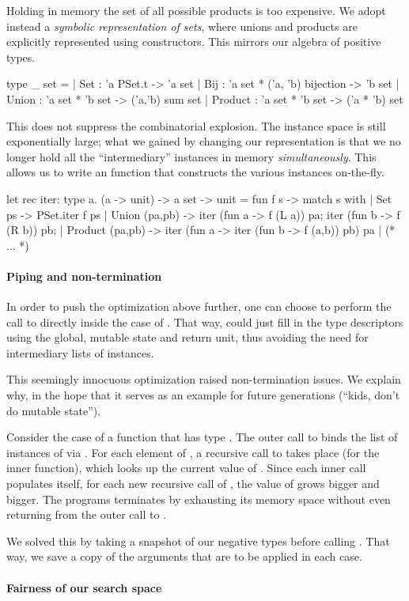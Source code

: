 Holding in memory the set of all possible products is too expensive. We adopt
instead a \emph{symbolic representation of sets}, where unions and products are
explicitly represented using constructors. This mirrors our algebra of positive
types.
%
\begin{ocamlcode}
type _ set =
  | Set   : 'a PSet.t -> 'a set
  | Bij   : 'a set * ('a, 'b) bijection -> 'b set
  | Union   : 'a set * 'b set -> ('a,'b) sum set
  | Product : 'a set * 'b set -> ('a * 'b) set
\end{ocamlcode}
%
This does not suppress the combinatorial explosion. The instance space is still
exponentially large; what we gained by changing our representation is that we
no longer hold all the ``intermediary'' instances in memory
\emph{simultaneously}. This allows us to write an  function that
constructs the various instances on-the-fly.
%
\begin{ocamlcode}
let rec iter: type a. (a -> unit) -> a set -> unit =
fun f s -> match s with
  | Set ps ->
      PSet.iter f ps
  | Union (pa,pb) ->
      iter (fun a -> f (L a)) pa;
      iter (fun b -> f (R b)) pb;
  | Product (pa,pb) ->
      iter (fun a -> iter (fun b -> f (a,b)) pb) pa
  | (* ... *)
\end{ocamlcode}
%

\paragraph{Piping and non-termination}
In order to push the optimization above further, one can choose to perform the
call to  directly inside the  case of .
That way,  could just fill in the type descriptors using the global,
mutable state and return unit, thus avoiding the need for intermediary lists of
instances.

This seemingly innocuous optimization raised non-termination issues. We explain
why, in the hope that it serves as an example for future generations (``kids,
don't do mutable state'').

Consider the case of a function that has type . The outer call
to  binds the list of instances of  via . For each element of , a recursive call to  takes
place (for the inner  function), which looks up the current value
of . Since each inner call populates  itself, for
each new recursive call of , the value of  grows
bigger and bigger. The programs terminates by exhausting its memory space
without even returning from the outer call to .

We solved this by taking a snapshot of our negative types before calling
. That way, we save a copy of the arguments that are to be applied
in each  case.

\paragraph{Fairness of our search space}

